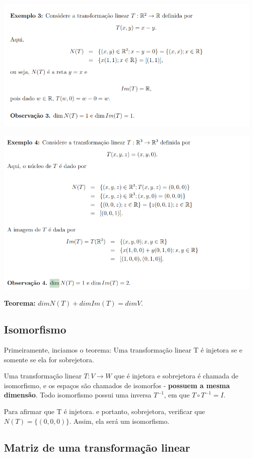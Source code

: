 \documentclass[letterpaper, 11pt]{article}
\begin{document}
\begin{center}
\includegraphics[width=.9\linewidth]{./img/ex3.png}
\end{center}

\begin{center}
\includegraphics[width=.9\linewidth]{./img/ex4.png}
\end{center}

\textbf{Teorema:} \(dimN(T) + dimIm (T) = dim V\).
\subsection{Isomorfismo}
\label{sec:org5f779a2}
Primeiramente, inciamos o teorema: Uma transformação linear T é injetora se e somente se ela for sobrejetora.

Uma transformação linear \(T: V \to W\) que é injetora e sobrejetora é chamada de isomorfismo, e os espaços são chamados de isomorfos - \textbf{possuem a mesma dimensão}. Todo isomorfismo possui
uma inversa \(T^{-1}\), em que \(T \circ T^{-1} = I\).

Para afirmar que T é injetora. e portanto, sobrejetora, verificar que \(N(T) = \{(0,0,0)\}\). Assim, ela será um isomorfismo.
\subsection{Matriz de uma transformação linear}
\label{sec:org4024d7b}
\end{document}
